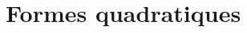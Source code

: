 \documentclass[./main]{subfiles}
\begin{document}
  \chapter{Formes quadratiques}
  \minitoc
\end{document}
